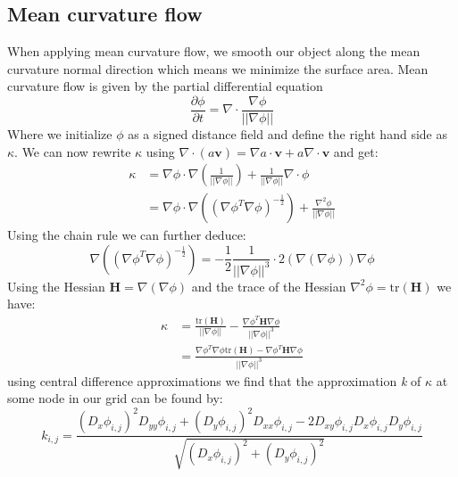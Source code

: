 \subsection{Mean curvature flow}
When applying mean curvature flow, we smooth our object along the mean curvature normal direction which means we minimize the surface area. Mean curvature flow is given by the partial differential equation
\begin{equation*}
	\frac{\partial \phi}{\partial t} = \nabla \cdot \frac{\nabla \phi}{||\nabla \phi||}
\end{equation*}
Where we initialize $\phi$ as a signed distance field and define the right hand side as $\kappa$. We can now rewrite $\kappa$ using $\nabla \cdot (a\mathbf{v}) = \nabla a\cdot \mathbf{v}+a\nabla\cdot \mathbf{v}$ and get:
\begin{align*}
	\kappa &= \nabla \phi \cdot \nabla \left(\frac{1}{||\nabla \phi ||} \right) + \frac{1}{||\nabla \phi ||}\nabla\cdot \phi \\
	&= \nabla \phi \cdot \nabla \left( \left( \nabla \phi^T\nabla \phi \right)^{-\frac{1}{2}}\right) + \frac{\nabla^2\phi}{||\nabla \phi ||}
\end{align*}
Using the chain rule we can further deduce:
\begin{equation*}
	\nabla\left( \left( \nabla \phi^T\nabla \phi \right)^{-\frac{1}{2}}\right) = -\frac{1}{2}\frac{1}{||\nabla\phi||^3}\cdot 2(\nabla(\nabla\phi))\nabla\phi
\end{equation*}
Using the Hessian $\mathbf{H} = \nabla(\nabla\phi)$ and the trace of the Hessian $\nabla^2\phi = \text{tr}(\mathbf{H})$ we have:
\begin{align*}
	\kappa &= \frac{\text{tr}(\mathbf{H})}{||\nabla\phi||} - \frac{\nabla\phi^T\mathbf{H}\nabla\phi}{||\nabla\phi||^3}\\
	&= \frac{\nabla\phi^T\nabla\phi \text{tr}(\mathbf{H}) - \nabla\phi^T\mathbf{H}\nabla\phi}{||\nabla\phi||^3}
\end{align*}
using central difference approximations we find that the approximation \textit{k} of $\kappa$ at some node in our grid can be found by:
\begin{equation}\label{denominator}
	k_{i,j} = \frac{(D_x\phi_{i,j})^2D_{yy}\phi_{i,j} + (D_y\phi_{i,j})^2D_{xx}\phi_{i,j} - 2D_{xy}\phi_{i,j}D_x\phi_{i,j}D_y\phi_{i,j}}{\sqrt{(D_x\phi_{i,j})^2+(D_y\phi_{i,j})^2}}
\end{equation}
